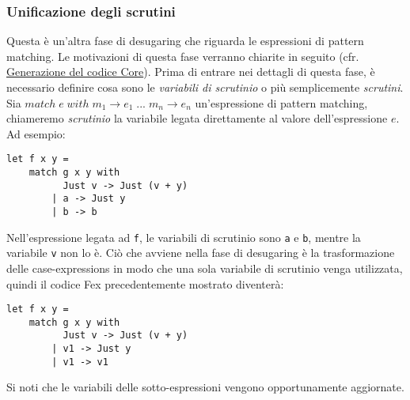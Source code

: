\documentclass[10pt,a4paper]{article}
\begin{document}
\hypertarget{Unificazione degli scrutini}{\subsubsection{Unificazione degli scrutini}}
Questa è un'altra fase di desugaring che riguarda le espressioni di pattern matching. Le motivazioni di questa
fase verranno chiarite in seguito (cfr. \hyperlink{Generazione del codice Core}{Generazione del codice Core}). Prima di
entrare nei dettagli di questa fase,
è necessario definire cosa sono le \textit{variabili di scrutinio} o più semplicemente \textit{scrutini}. Sia
$ match \; e \; with \; m_1 \rightarrow e_1 \; ... \; m_n \rightarrow e_n $ un'espressione di pattern matching,
chiameremo \textit{scrutinio} la variabile legata direttamente al valore dell'espressione $ e $. Ad esempio:
\begin{lstlisting}
let f x y =
    match g x y with
          Just v -> Just (v + y)
        | a -> Just y
        | b -> b
\end{lstlisting}
Nell'espressione legata ad \texttt{f}, le variabili di scrutinio sono \texttt{a} e \texttt{b}, mentre la variabile
\texttt{v} non lo è. Ciò che avviene nella fase di desugaring è la trasformazione delle case-expressions in modo che
una sola variabile di scrutinio venga utilizzata, quindi il codice Fex precedentemente mostrato diventerà:
\begin{lstlisting}
let f x y =
    match g x y with
          Just v -> Just (v + y)
        | v1 -> Just y
        | v1 -> v1
\end{lstlisting}
Si noti che le variabili delle sotto-espressioni vengono opportunamente aggiornate.
\end{document}
